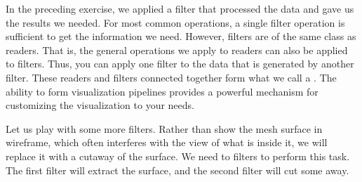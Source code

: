 In the preceding exercise, we applied a filter that processed the data and
gave us the results we needed.  For most common operations, a single filter
operation is sufficient to get the information we need.  However, filters
are of the same class as readers.  That is, the general operations we apply
to readers can also be applied to filters.  Thus, you can apply one filter
to the data that is generated by another filter.  These readers and filters
connected together form what we call a .
The ability to form visualization pipelines provides a powerful mechanism
for customizing the visualization to your needs.

Let us play with some more filters.  Rather than show the mesh surface in
wireframe, which often interferes with the view of what is inside it, we
will replace it with a cutaway of the surface.  We need to filters to
perform this task.  The first filter will extract the surface, and the
second filter will cut some away.

